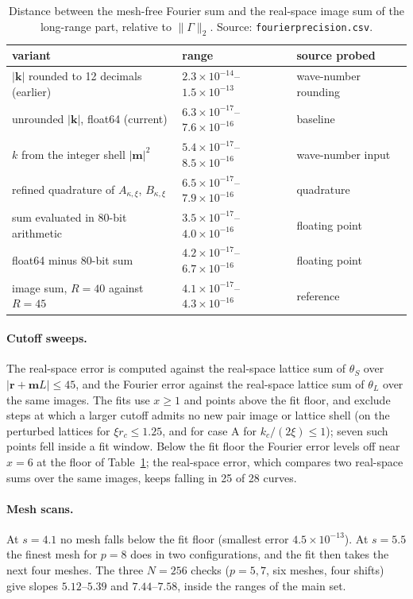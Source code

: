 \documentclass[11pt]{article}
\theoremstyle{plain}
\newcommand{\rr}{\bm r}
\newcommand{\kk}{\bm k}
\DeclareRobustCommand{\_}{\textunderscore\allowbreak}
\begin{document}
\begin{table}[htbp]
\centering
\small
\begin{tabular}{lll}
\toprule
variant & range & source probed \\
\midrule
$|\kk|$ rounded to 12 decimals (earlier) & $2.3\times10^{-14}$--$1.5\times10^{-13}$ & wave-number rounding \\
unrounded $|\kk|$, float64 (current) & $6.3\times10^{-17}$--$7.6\times10^{-16}$ & baseline \\
$k$ from the integer shell $|\bm m|^2$ & $5.4\times10^{-17}$--$8.5\times10^{-16}$ & wave-number input \\
refined quadrature of $A_{\kappa,\xi}$, $B_{\kappa,\xi}$ & $6.5\times10^{-17}$--$7.9\times10^{-16}$ & quadrature \\
sum evaluated in 80-bit arithmetic & $3.5\times10^{-17}$--$4.0\times10^{-16}$ & floating point \\
float64 minus 80-bit sum & $4.2\times10^{-17}$--$6.7\times10^{-16}$ & floating point \\
image sum, $R=40$ against $R=45$ & $4.1\times10^{-17}$--$4.3\times10^{-16}$ & reference \\
\bottomrule
\end{tabular}
\caption{Distance between the mesh-free Fourier sum and the real-space image sum of the long-range part, relative to
$\|\Gamma\|_2$. Source: \texttt{fourier\_precision.csv}.}
\label{tab:exp-floor}
\end{table}

\paragraph{Cutoff sweeps.}
The real-space error is computed against the real-space lattice sum of
$\theta_S$ over $|\rr+\bm mL|\le45$, and the Fourier error against the
real-space lattice sum of $\theta_L$ over the same images. The fits use
$x\ge1$ and points above the fit floor, and exclude steps at which a larger
cutoff admits no new pair image or lattice shell (on the perturbed lattices
for $\xi r_c\le1.25$, and for case A for $k_c/(2\xi)\le1$); seven such points
fell inside a fit window. Below the fit floor the Fourier error levels off
near $x=6$ at the floor of Table~\ref{tab:exp-floor}; the real-space error,
which compares two real-space sums over the same images, keeps falling in 25
of 28 curves.

\paragraph{Mesh scans.}
At $s=4.1$ no mesh falls below the fit floor (smallest error
$4.5\times10^{-13}$). At $s=5.5$ the finest mesh for $p=8$ does in two
configurations, and the fit then takes the next four meshes. The three $N=256$
checks ($p=5,7$, six meshes, four shifts) give slopes $5.12$--$5.39$ and
$7.44$--$7.58$, inside the ranges of the main set.


\end{document}
